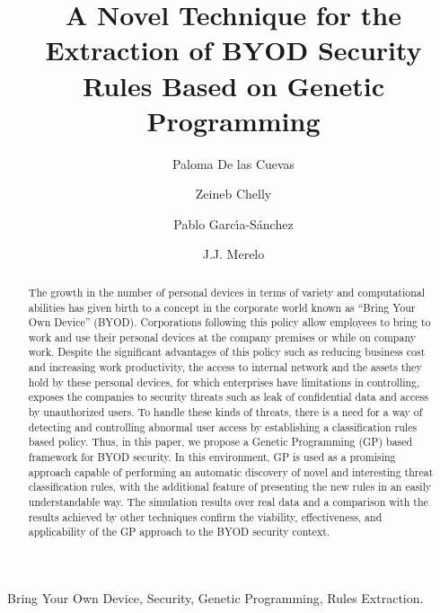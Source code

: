\documentclass[a4paper,10pt,twocolumn,preprint,3p]{elsarticle}
\begin{document}
\begin{frontmatter}

\title{A Novel Technique for the Extraction of BYOD Security Rules  Based on Genetic Programming}

\author[ugr]{Paloma De las Cuevas}
\author[isgt]{Zeineb Chelly}
\author[ugr]{Pablo Garc\'{\i}a-S\'anchez}
\author[ugr]{J.J. Merelo}

\address[ugr]{Department of Computer Architecture and Computer Technology, ETSIIT and CITIC \\
University of Granada, Granada, Spain. Tel: +34958241778. Fax: +34958248993}
\address[isgt]{LARODEC, Institut Sup\'erieur de Gestion de Tunis, Tunisia.}


\begin{abstract}
The growth in the number of personal devices in terms of variety and computational
abilities has given birth to a concept in the corporate world
known as ``Bring Your Own Device'' (BYOD).
Corporations following this policy allow 
employees to bring to work and use their personal devices at
the company premises or while on company work. Despite the  significant advantages of this policy such as reducing
business cost and increasing work productivity, the access to internal network and the assets they hold by these personal devices, for which
enterprises have limitations in controlling, exposes the companies to
security threats such as leak of confidential data and access by
unauthorized users. %
To handle these kinds of threats, there
is a need for a way of detecting and controlling abnormal user
access by establishing a classification rules based policy. Thus, in
this paper, we propose a Genetic Programming (GP) based framework for
BYOD security. In this environment, GP is used as a promising approach
capable of performing an automatic discovery of novel and interesting
threat classification rules, with the additional feature of presenting the new rules in an easily understandable way.
The simulation results over real data and a
comparison with the results achieved by other techniques confirm the
viability, effectiveness, and applicability of the GP approach to the
BYOD security context.
\end{abstract}


\begin{keyword}
Bring Your Own Device, Security, Genetic Programming, Rules Extraction. 
\end{keyword}

\end{frontmatter}
\end{document}
